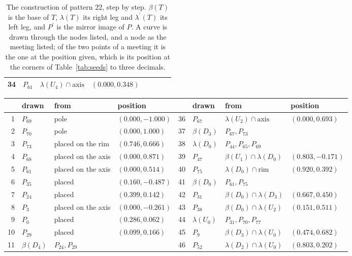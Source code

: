 \begin{table}[p]
\begin{tabular}{@{}rlll@{\qquad}rlll@{}}
34 & $P_{61}$ & $\lambda(U_{4}) \cap \text{axis}$ & $(0.000, 0.348)$ &  &  &  &  \\
\bottomrule
\end{tabular}
\caption{The construction of pattern $22$, step by step. $\beta(T)$ is the base of $T$, $\lambda(T)$ its right leg and $\lambda^\prime(T)$ its left leg, and $P^\prime$ is the mirror image of $P$. A curve is drawn through the nodes listed, and a node as the meeting listed; of the two points of a meeting it is the one at the position given, which is its position at the corners of Table~\ref{tab:seeds} to three decimals.}
\label{tab:steps22}
\end{table}

\begin{table}[p]
\centering\scriptsize
\setlength{\tabcolsep}{3.2pt}
\begin{tabular}{@{}rlll@{\qquad}rlll@{}}
\toprule
& drawn & from & position & & drawn & from & position \\ \midrule
1 & $P_{69}$ & pole & $(0.000, -1.000)$ & 36 & $P_{67}$ & $\lambda(U_{2}) \cap \text{axis}$ & $(0.000, 0.693)$ \\
2 & $P_{70}$ & pole & $(0.000, 1.000)$ & 37 & $\beta(D_{3})$ & $P_{67}, P_{73}$ &  \\
3 & $P_{73}$ & placed on the rim & $(0.746, 0.666)$ & 38 & $\lambda(D_{0})$ & $P_{44}, P_{65}, P_{69}$ &  \\
4 & $P_{68}$ & placed on the axis & $(0.000, 0.871)$ & 39 & $P_{47}$ & $\beta(U_{1}) \cap \lambda(D_{0})$ & $(0.803, -0.171)$ \\
5 & $P_{61}$ & placed on the axis & $(0.000, 0.514)$ & 40 & $P_{75}$ & $\lambda(D_{0}) \cap \text{rim}$ & $(0.920, 0.392)$ \\
6 & $P_{35}$ & placed & $(0.160, -0.487)$ & 41 & $\beta(D_{0})$ & $P_{61}, P_{75}$ &  \\
7 & $P_{24}$ & placed & $(0.399, 0.142)$ & 42 & $P_{31}$ & $\beta(D_{0}) \cap \lambda(D_{3})$ & $(0.667, 0.450)$ \\
8 & $P_{3}$ & placed on the axis & $(0.000, -0.261)$ & 43 & $P_{38}$ & $\beta(D_{0}) \cap \lambda(U_{2})$ & $(0.151, 0.511)$ \\
9 & $P_{0}$ & placed & $(0.286, 0.062)$ & 44 & $\lambda(U_{0})$ & $P_{31}, P_{70}, P_{77}$ &  \\
10 & $P_{29}$ & placed & $(0.099, 0.166)$ & 45 & $P_{9}$ & $\beta(D_{3}) \cap \lambda(U_{0})$ & $(0.474, 0.682)$ \\
11 & $\beta(D_{4})$ & $P_{24}, P_{29}$ &  & 46 & $P_{52}$ & $\lambda(D_{2}) \cap \lambda(U_{0})$ & $(0.803, 0.202)$ \\

\end{tabular}
\end{table}
